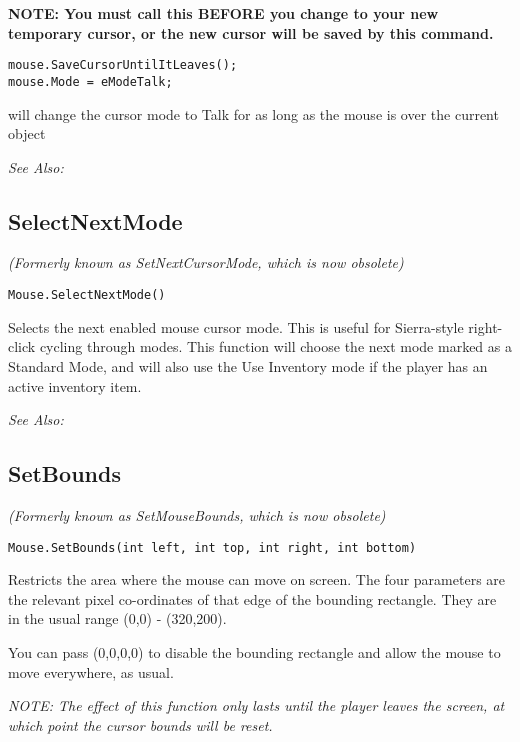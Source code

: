\bf{NOTE:} You must call this \bf{BEFORE} you change to your new temporary cursor, or the
new cursor will be saved by this command.

\begin{verbatim}
mouse.SaveCursorUntilItLeaves();
mouse.Mode = eModeTalk;
\end{verbatim}
will change the cursor mode to Talk for as long as the mouse is over the current object

\it{See Also:} 


\subsection{SelectNextMode}\label{Mouse.SelectNextMode}%

\it{(Formerly known as SetNextCursorMode, which is now obsolete)}

\begin{verbatim}
Mouse.SelectNextMode()
\end{verbatim}
Selects the next enabled mouse cursor mode. This is useful for Sierra-style right-click
cycling through modes. This function will choose the next mode marked as a Standard Mode, and
will also use the Use Inventory mode if the player has an active inventory item.

\it{See Also:} 


\subsection{SetBounds}\label{Mouse.SetBounds}%

\it{(Formerly known as SetMouseBounds, which is now obsolete)}

\begin{verbatim}
Mouse.SetBounds(int left, int top, int right, int bottom)
\end{verbatim}

Restricts the area where the mouse can move on screen. The four parameters are
the relevant pixel co-ordinates of that edge of the bounding rectangle. They are
in the usual range (0,0) - (320,200).

You can pass (0,0,0,0) to disable the bounding rectangle and allow the mouse to move
everywhere, as usual.

\it{NOTE:} The effect of this function only lasts until the player leaves the screen,
at which point the cursor bounds will be reset.

